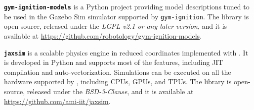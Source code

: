 \vspace{3mm}
\noindent
\textbf{\texttt{gym-ignition-models}} is a Python project providing model descriptions tuned to be used in the Gazebo Sim simulator supported by \texttt{gym-ignition}. The library is open-source, released under the \emph{LGPL v2.1 or any later version}, and it is available at \url{https://github.com/robotology/gym-ignition-models}.

\vspace{3mm}
\noindent
\textbf{\texttt{jaxsim}} is a scalable physics engine in reduced coordinates implemented with \jax. It is developed in Python and supports most of the \jax features, including \ac{JIT} compilation and auto-vectorization. Simulations can be executed on all the hardware supported by \jax, including \acp{CPU}, \acp{GPU}, and \acp{TPU}. The library is open-source, released under the \emph{BSD-3-Clause}, and it is available at \url{https://github.com/ami-iit/jaxsim}.
